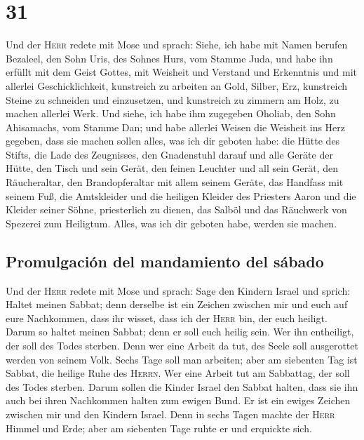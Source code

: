 \hypertarget{section-30}{%
\section{31}\label{section-30}}

 Und der \textsc{Herr} redete mit Mose und sprach:
 Siehe, ich habe mit Namen berufen Bezaleel, den Sohn
Uris, des Sohnes Hurs, vom Stamme Juda,  und habe ihn
erfüllt mit dem Geist Gottes, mit Weisheit und Verstand und Erkenntnis
und mit allerlei Geschicklichkeit,  kunstreich zu arbeiten
an Gold, Silber, Erz,  kunstreich Steine zu schneiden und
einzusetzen, und kunstreich zu zimmern am Holz, zu machen allerlei Werk.
 Und siehe, ich habe ihm zugegeben Oholiab, den Sohn
Ahisamachs, vom Stamme Dan; und habe allerlei Weisen die Weisheit ins
Herz gegeben, dass sie machen sollen alles, was ich dir geboten habe:
 die Hütte des Stifts, die Lade des Zeugnisses, den
Gnadenstuhl darauf und alle Geräte der Hütte,  den Tisch
und sein Gerät, den feinen Leuchter und all sein Gerät, den
Räucheraltar,  den Brandopferaltar mit allem seinem
Geräte, das Handfass mit seinem Fuß,  die Amtskleider und
die heiligen Kleider des Priesters Aaron und die Kleider seiner Söhne,
priesterlich zu dienen,  das Salböl und das Räuchwerk von
Spezerei zum Heiligtum. Alles, was ich dir geboten habe, werden sie
machen.

\hypertarget{promulgaciuxf3n-del-mandamiento-del-suxe1bado}{%
\subsection{Promulgación del mandamiento del
sábado}\label{promulgaciuxf3n-del-mandamiento-del-suxe1bado}}

 Und der \textsc{Herr} redete mit Mose und sprach:
 Sage den Kindern Israel und sprich: Haltet meinen
Sabbat; denn derselbe ist ein Zeichen zwischen mir und euch auf eure
Nachkommen, dass ihr wisset, dass ich der \textsc{Herr} bin, der euch
heiligt.  Darum so haltet meinen Sabbat; denn er soll
euch heilig sein. Wer ihn entheiligt, der soll des Todes sterben. Denn
wer eine Arbeit da tut, des Seele soll ausgerottet werden von seinem
Volk.  Sechs Tage soll man arbeiten; aber am siebenten
Tag ist Sabbat, die heilige Ruhe des \textsc{Herrn}. Wer eine Arbeit tut
am Sabbattag, der soll des Todes sterben.  Darum sollen
die Kinder Israel den Sabbat halten, dass sie ihn auch bei ihren
Nachkommen halten zum ewigen Bund.  Er ist ein ewiges
Zeichen zwischen mir und den Kindern Israel. Denn in sechs Tagen machte
der \textsc{Herr} Himmel und Erde; aber am siebenten Tage ruhte er und
erquickte sich.

